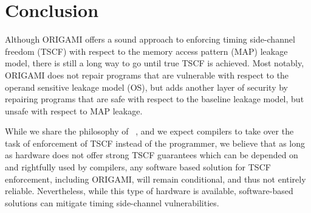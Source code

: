 { %



\section{Conclusion}
\label{sec:Conclusion}
Although ORIGAMI offers a sound approach to enforcing timing side-channel freedom (TSCF) with respect to the memory access pattern (MAP) leakage model, there is still a long way to go until true TSCF is achieved. Most notably, ORIGAMI does not repair programs that are vulnerable with respect to the operand sensitive leakage model (OS), but adds another layer of security by repairing programs that are safe with respect to the baseline leakage model, but unsafe with respect to MAP leakage. 

While we share the philosophy of ~\cite{WhatYouCisWhatYouGet}, and we expect compilers to take over the task of enforcement of TSCF instead of the programmer, we believe that as long as hardware does not offer strong TSCF guarantees which can be depended on and rightfully used by compilers, any software based solution for TSCF enforcement, including ORIGAMI, will remain conditional, and thus not entirely reliable. Nevertheless, while this type of hardware is available, software-based solutions can mitigate timing side-channel vulnerabilities.
}